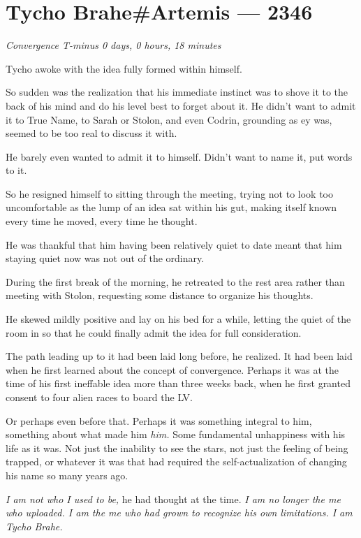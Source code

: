 \hypertarget{tycho-braheartemis-2346}{%
\chapter{Tycho Brahe\#Artemis — 2346}\label{tycho-braheartemis-2346}}

\begin{center}
\emph{Convergence T-minus 0 days, 0 hours, 18 minutes}
\end{center}

\noindent Tycho awoke with the idea fully formed within himself.

So sudden was the realization that his immediate instinct was to shove it to the back of his mind and do his level best to forget about it. He didn't want to admit it to True Name, to Sarah or Stolon, and even Codrin, grounding as ey was, seemed to be too real to discuss it with.

He barely even wanted to admit it to himself. Didn't want to name it, put words to it.

So he resigned himself to sitting through the meeting, trying not to look too uncomfortable as the lump of an idea sat within his gut, making itself known every time he moved, every time he thought.

He was thankful that him having been relatively quiet to date meant that him staying quiet now was not out of the ordinary.

During the first break of the morning, he retreated to the rest area rather than meeting with Stolon, requesting some distance to organize his thoughts.

He skewed mildly positive and lay on his bed for a while, letting the quiet of the room in so that he could finally admit the idea for full consideration.

The path leading up to it had been laid long before, he realized. It had been laid when he first learned about the concept of convergence. Perhaps it was at the time of his first ineffable idea more than three weeks back, when he first granted consent to four alien races to board the LV.

Or perhaps even before that. Perhaps it was something integral to him, something about what made him \emph{him.} Some fundamental unhappiness with his life as it was. Not just the inability to see the stars, not just the feeling of being trapped, or whatever it was that had required the self-actualization of changing his name so many years ago.

\emph{I am not who I used to be,} he had thought at the time. \emph{I am no longer the me who uploaded. I am the me who had grown to recognize his own limitations. I am Tycho Brahe.}

